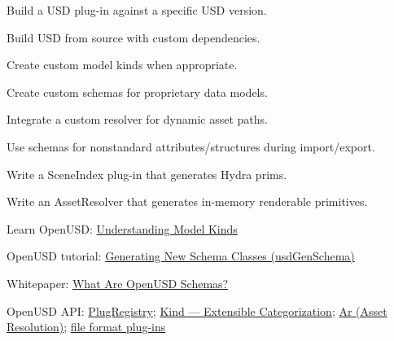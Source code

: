 
\begin{Objectives}
  \item Build a USD plug-in against a specific USD version.
  \item Build USD from source with custom dependencies.
  \item Create custom model kinds when appropriate.
  \item Create custom schemas for proprietary data models.
  \item Integrate a custom resolver for dynamic asset paths.
  \item Use schemas for nonstandard attributes/structures during import/export.
  \item Write a SceneIndex plug-in that generates Hydra prims.
  \item Write an AssetResolver that generates in-memory renderable primitives.
\end{Objectives}

\begin{Resources}
  \item Learn OpenUSD: \href{https://docs.nvidia.com/learn-openusd/latest/beyond-basics/model-kinds.html}{Understanding Model Kinds}
  \item OpenUSD tutorial: \href{https://openusd.org/release/tut_generating_new_schema.html}{Generating New Schema Classes (usdGenSchema)}
  \item Whitepaper: \href{https://aousd.org/blog/explainer-series-for-developers-what-are-openusd-schemas/}{What Are OpenUSD Schemas?}
  \item OpenUSD API: \href{https://openusd.org/release/api/class_plug_registry.html#plug_RegisteringPlugins}{PlugRegistry};
        \href{https://openusd.org/release/api/kind_page_front.html}{Kind --- Extensible Categorization};
        \href{https://openusd.org/release/api/ar_page_front.html}{Ar (Asset Resolution)};
        \href{https://openusd.org/release/api/_sdf__page__file_format_plugin.html}{file format plug-ins}
\end{Resources}

